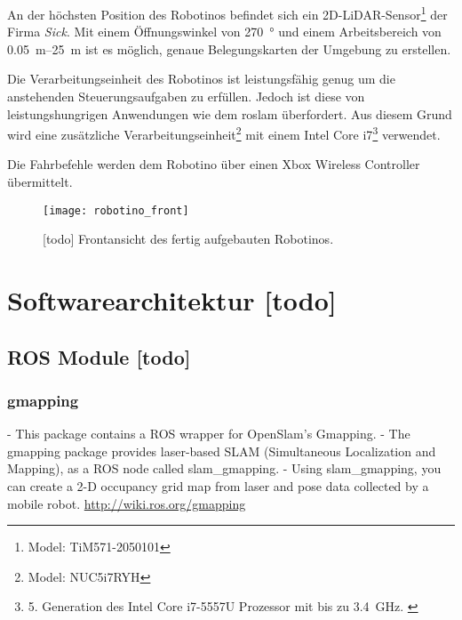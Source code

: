 An der höchsten Position des Robotinos befindet sich ein 2D-LiDAR-Sensor\footnote{Model: TiM571-2050101} der Firma \textit{Sick}. Mit einem Öffnungswinkel von \SI{270}{\degree} und einem Arbeitsbereich von \SIrange{0.05}{25}{\meter} ist es möglich, genaue Belegungskarten der Umgebung zu erstellen. \cite{sick2016operatingmanual}

Die Verarbeitungseinheit des Robotinos ist leistungsfähig genug um die anstehenden Steuerungsaufgaben zu erfüllen. Jedoch ist diese von leistungshungrigen Anwendungen wie dem \Gls{roslam} überfordert. Aus diesem Grund wird eine zusätzliche Verarbeitungseinheit\footnote{Model: NUC5i7RYH} mit einem Intel Core i7\footnote{5. Generation des Intel Core i7-5557U Prozessor mit bis zu \SI{3.4}{\GHz}. \cite{intel2015nucproductbrief}} verwendet.

Die Fahrbefehle werden dem Robotino über einen Xbox Wireless Controller übermittelt.

\begin{figure}[h]
	\centering
	\texttt{[image: robotino\_front]}
	\caption{[todo] Frontansicht des fertig aufgebauten Robotinos.}
	\label{fig:robotino_front}
\end{figure}


\begin{comment}
------------------------------------------------------------------------------------------
\end{comment}
\section{Softwarearchitektur [todo]}


\begin{comment}
------------------------------------------------------------------------------------------
\end{comment}
\subsection{ROS Module [todo]}


\begin{comment}
------------------------------------------------------------------------------------------
\end{comment}
\subsubsection{gmapping}

- This package contains a ROS wrapper for OpenSlam's Gmapping.
- The gmapping package provides laser-based SLAM (Simultaneous Localization and Mapping), as a ROS node called slam\_gmapping.
- Using slam\_gmapping, you can create a 2-D occupancy grid map from laser and pose data collected by a mobile robot.
\url{http://wiki.ros.org/gmapping}

